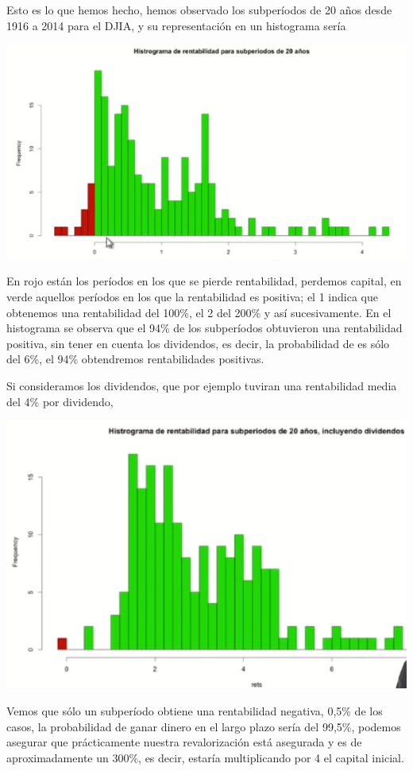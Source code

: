 Esto es lo que hemos hecho, hemos observado los subperíodos de 20 años desde 1916 a 2014 para el DJIA, y su representación en un histograma sería

\begin{center}
    \includegraphics[scale=.65]{images/mod03-10.png}
\end{center}
En rojo están los períodos en los que se pierde rentabilidad, perdemos capital, en verde aquellos períodos en los que la rentabilidad es positiva; el 1 indica que obtenemos una rentabilidad del 100\%, el 2 del 200\% y así sucesivamente. En el histograma se observa que el 94\% de los subperíodos obtuvieron una rentabilidad positiva, sin tener en cuenta los dividendos, es decir, la probabilidad de  es sólo del 6\%, el 94\% obtendremos rentabilidades positivas.

Si consideramos los dividendos, que por ejemplo tuviran una rentabilidad media del 4\% por dividendo,

\begin{center}
    \includegraphics[scale=.65]{images/mod03-11.png}
\end{center}
Vemos que sólo un subperíodo obtiene una rentabilidad negativa, 0,5\% de los casos, la probabilidad de ganar dinero en el largo plazo sería del 99,5\%, podemos asegurar que prácticamente nuestra revalorización está asegurada y es de aproximadamente un 300\%, es decir, estaría multiplicando por 4 el capital inicial.


